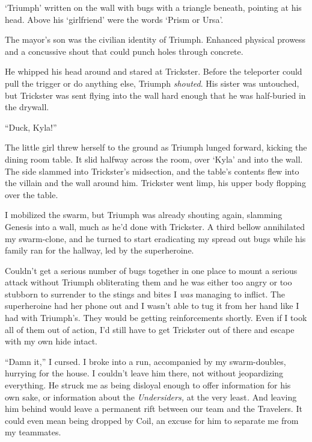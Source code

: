 `Triumph' written on the wall with bugs with a triangle beneath, pointing at his head.  Above his `girlfriend' were the words `Prism or Ursa'.



The mayor's son was the civilian identity of Triumph.  Enhanced physical prowess and a concussive shout that could punch holes through concrete.



He whipped his head around and stared at Trickster.  Before the teleporter could pull the trigger or do anything else, Triumph \emph{shouted}.  His sister was untouched, but Trickster was sent flying into the wall hard enough that he was half-buried in the drywall.



``Duck, Kyla!''



The little girl threw herself to the ground as Triumph lunged forward, kicking the dining room table.  It slid halfway across the room, over `Kyla' and into the wall. The side slammed into Trickster's midsection, and the table's contents flew into the villain and the wall around him.  Trickster went limp, his upper body flopping over the table.



I mobilized the swarm, but Triumph was already shouting again, slamming Genesis into a wall, much as he'd done with Trickster.  A third bellow annihilated my swarm-clone, and he turned to start eradicating my spread out bugs while his family ran for the hallway, led by the superheroine.



Couldn't get a serious number of bugs together in one place to mount a serious attack without Triumph obliterating them and he was either too angry or too stubborn to surrender to the stings and bites I \emph{was} managing to inflict.  The superheroine had her phone out and I wasn't able to tug it from her hand like I had with Triumph's.  They would be getting reinforcements shortly.  Even if I took all of them out of action, I'd still have to get Trickster out of there and escape with my own hide intact.



``Damn it,'' I cursed.  I broke into a run, accompanied by my swarm-doubles, hurrying for the house.  I couldn't leave him there, not without jeopardizing everything.  He struck me as being disloyal enough to offer information for his own sake, or information about the \emph{Undersiders, }at the very least\emph{.  }And leaving him behind would leave a permanent rift between our team and the Travelers.  It could even mean being dropped by Coil, an excuse for him to separate me from my teammates.




